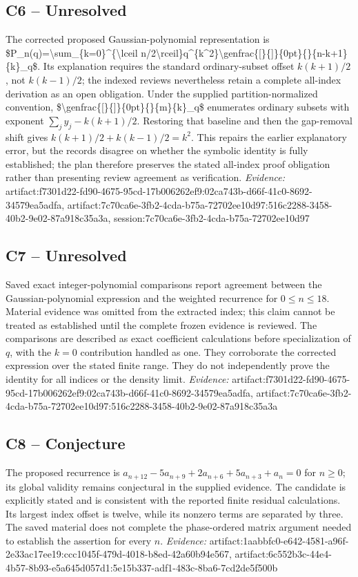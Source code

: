 \documentclass[11pt]{article}
\begin{document}
\subsection{C6 -- Unresolved}
The corrected proposed Gaussian-polynomial representation is \$P\_n(q)=\textbackslash{}sum\_\{k=0\}\textasciicircum{}\{\textbackslash{}lceil n/2\textbackslash{}rceil\}q\textasciicircum{}\{k\textasciicircum{}2\}\textbackslash{}genfrac\{[\}\{]\}\{0pt\}\{\}\{n-k+1\}\{k\}\_q\$. Its explanation requires the standard ordinary-subset offset $k(k+1)/2$, not $k(k-1)/2$; the indexed reviews nevertheless retain a complete all-index derivation as an open obligation.
Under the supplied partition-normalized convention, \$\textbackslash{}genfrac\{[\}\{]\}\{0pt\}\{\}\{m\}\{k\}\_q\$ enumerates ordinary subsets with exponent $\sum_j y_j-k(k+1)/2$. Restoring that baseline and then the gap-removal shift gives $k(k+1)/2+k(k-1)/2=k^2$. This repairs the earlier explanatory error, but the records disagree on whether the symbolic identity is fully established; the plan therefore preserves the stated all-index proof obligation rather than presenting review agreement as verification.
\textit{Evidence: }artifact:f7301d22-fd90-4675-95cd-17b006262ef9:02ca743b-d66f-41c0-8692-34579ea5adfa, artifact:7c70ca6e-3fb2-4cda-b75a-72702ee10d97:516c2288-3458-40b2-9e02-87a918c35a3a, session:7c70ca6e-3fb2-4cda-b75a-72702ee10d97
\subsection{C7 -- Unresolved}
Saved exact integer-polynomial comparisons report agreement between the Gaussian-polynomial expression and the weighted recurrence for $0\leq n\leq18$.
Material evidence was omitted from the extracted index; this claim cannot be treated as established until the complete frozen evidence is reviewed. The comparisons are described as exact coefficient calculations before specialization of $q$, with the $k=0$ contribution handled as one. They corroborate the corrected expression over the stated finite range. They do not independently prove the identity for all indices or the density limit.
\textit{Evidence: }artifact:f7301d22-fd90-4675-95cd-17b006262ef9:02ca743b-d66f-41c0-8692-34579ea5adfa, artifact:7c70ca6e-3fb2-4cda-b75a-72702ee10d97:516c2288-3458-40b2-9e02-87a918c35a3a
\subsection{C8 -- Conjecture}
The proposed recurrence is $a_{n+12}-5a_{n+9}+2a_{n+6}+5a_{n+3}+a_n=0$ for $n\geq0$; its global validity remains conjectural in the supplied evidence.
The candidate is explicitly stated and is consistent with the reported finite residual calculations. Its largest index offset is twelve, while its nonzero terms are separated by three. The saved material does not complete the phase-ordered matrix argument needed to establish the assertion for every $n$.
\textit{Evidence: }artifact:1aabbfc0-e642-4581-a96f-2e33ac17ee19:ccc1045f-479d-4018-b8ed-42a60b94e567, artifact:6c552b3c-44e4-4b57-8b93-e5a645d057d1:5e15b337-adf1-483c-8ba6-7cd2de5f500b
\end{document}
